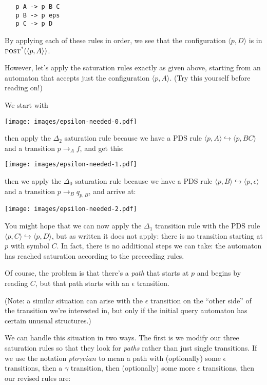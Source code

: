 \documentclass{article}
\newcommand{\Config}[2]{\ensuremath{\langle #1, #2 \rangle}}
\newcommand{\Rule}[2]{\ensuremath{#1 \hookrightarrow #2}}
\newcommand{\Trans}[3]{\ensuremath{#1 \rightarrow_{#2} #3}}
\newcommand{\epspath}[3]{\ensuremath{#1 to #2 via #3}}
\newcommand{\poststar}{\ensuremath{\textsc{post}^\textsc{*}}}
\begin{document}
\begin{verbatim}
   p A -> p B C
   p B -> p eps
   p C -> p D
\end{verbatim}

By applying each of these rules in order, we see that the
configuration \Config{p}{D} is in $\poststar(\Config{p}{A})$.

However, let's apply the saturation rules exactly as given above,
starting from an automaton that accepts just the configuration
\Config{p}{A}. (Try this yourself before reading on!)

We start with
\begin{center}
  \texttt{[image: images/epsilon-needed-0.pdf]}
\end{center}

then apply the $\Delta_2$ saturation rule because we have a PDS rule
\Rule{\Config{p}{A}}{\Config{p}{B C}} and a transition \Trans{p}{A}{f},
and get this:
\begin{center}
  \texttt{[image: images/epsilon-needed-1.pdf]}
\end{center}

then we apply the $\Delta_0$ saturation rule because we have a PDS
rule \Rule{\Config{p}{B}}{\Config{p}{\epsilon}} and a transition
\Trans{p}{B}{q_{p,B}}, and arrive at:
\begin{center}
  \texttt{[image: images/epsilon-needed-2.pdf]}
\end{center}

You might hope that we can now apply the $\Delta_1$ transition rule
with the PDS rule \Rule{\Config{p}{C}}{\Config{p}{D}}, but as written
it does not apply: there is no transition starting at $p$ with symbol
$C$. In fact, there is no additional steps we can take: the automaton
has reached saturation according to the preceeding rules.

Of course, the problem is that there's a \emph{path} that starts at
$p$ and begins by reading $C$, but that path starts with an $\epsilon$
transition.

(Note: a similar situation can arise with the $\epsilon$ transition on
the ``other side'' of the transition we're interested in, but only if
the initial query automaton has certain unusual structures.)

We can handle this situation in two ways. The first is we modify our
three saturation rules so that they look for \emph{paths} rather than
just single transitions. If we use the notation \epspath{p}{\gamma}{n}
to mean a path with (optionally) some $\epsilon$ transitions, then a
$\gamma$ transition, then (optionally) some more $\epsilon$ transitions,
then our revised rules are:
\end{document}
